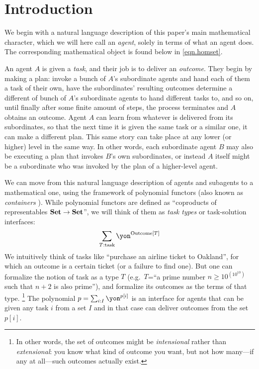 \chapter{Introduction}\label{sec:intro}

We begin with a natural language description of this paper's main mathematical character, which we will here call an \emph{agent}, solely in terms of what an agent does. The corresponding mathematical object is found below in \eqref{eqn.homset}.

An agent $A$ is given a \emph{task}, and their job is to deliver an \emph{outcome}. They begin by making a plan: invoke a bunch of $A$'s subordinate agents and hand each of them a task of their own, have the subordinates' resulting outcomes determine a different of bunch of $A$'s subordinate agents to hand different tasks to, and so on, until finally after some finite amount of steps, the process terminates and $A$ obtains an outcome. Agent $A$ can learn from whatever is delivered from its subordinates, so that the next time it is given the same task or a similar one, it can make a different plan. This same story can take place at any lower (or higher) level in the same way. In other words, each subordinate agent $B$ may also be executing a plan that invokes $B$'s own subordinates, or instead $A$ itself might be a subordinate who was invoked by the plan of a higher-level agent.

We can move from this natural language description of agents and subagents to a mathematical one, using the framework of polynomial functors (also known as \emph{containers} \cite{abbott2005containers,abbot2003categoriesthesis,ahman2014when}). While polynomial functors are defined as ``coproducts of representables $\mathbf{Set}\to\mathbf{Set}$'', we will think of them as \emph{task types} or task-solution interfaces:
\[
\sum_{T:\text{task}}\yon^{\text{Outcome}[T]}
\]
We intuitively think of tasks like ``purchase an airline ticket to Oakland'', for which an outcome is a certain ticket (or a failure to find one). But one can formalize the notion of task as a type $T$ (e.g.\ $T$=``a prime number $n\geq10^{(10^{10})}$ such that $n+2$ is also prime''), and formalize its outcomes as the terms of that type.%
\footnote{In other words, the set of outcomes might be \emph{intensional} rather than \emph{extensional}: you know what kind of outcome you want, but not how many---if any at all---such outcomes actually exist.} The polynomial $p=\sum_{i:I}\yon^{p[i]}$ is an interface for agents that can be given any task $i$ from a set $I$ and in that case can deliver outcomes from the set $p[i]$.

